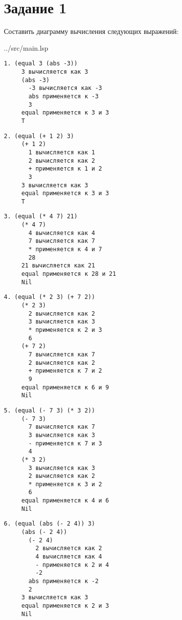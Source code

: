 \section*{Задание 1}

Составить диаграмму вычисления следующих выражений:

\begin{lstinputlisting}[
	caption={Задание 1},
	label={lst:t1},
	style={lsp},
	linerange={3-8},
	]{../src/main.lsp}
\end{lstinputlisting}

\begin{lstlisting}[style={scheme}]
1. (equal 3 (abs -3))
     3 вычисляется как 3
     (abs -3)
       -3 вычисляется как -3
       abs применяется к -3
       3
     equal применяется к 3 и 3
     T
\end{lstlisting}

\begin{lstlisting}[style={scheme}]
2. (equal (+ 1 2) 3)
     (+ 1 2)
       1 вычисляется как 1
       2 вычисляется как 2
       + применяется к 1 и 2
       3
     3 вычисляется как 3
     equal применяется к 3 и 3
     T
\end{lstlisting}

\clearpage
\begin{lstlisting}[style={scheme}]
3. (equal (* 4 7) 21)
     (* 4 7)
       4 вычисляется как 4
       7 вычисляется как 7
       * применяется к 4 и 7
       28
     21 вычисляется как 21
     equal применяется к 28 и 21
     Nil
\end{lstlisting}

\begin{lstlisting}[style={scheme}]
4. (equal (* 2 3) (+ 7 2))
     (* 2 3)
       2 вычисляется как 2
       3 вычисляется как 3
       * применяется к 2 и 3
       6
     (+ 7 2)
       7 вычисляется как 7
       2 вычисляется как 2
       + применяется к 7 и 2
       9
     equal применяется к 6 и 9
     Nil
\end{lstlisting}

\clearpage
\begin{lstlisting}[style={scheme}]
5. (equal (- 7 3) (* 3 2))
     (- 7 3)
       7 вычисляется как 7
       3 вычисляется как 3
       - применяется к 7 и 3
       4
     (* 3 2)
       3 вычисляется как 3
       2 вычисляется как 2
       * применяется к 3 и 2
       6
     equal применяется к 4 и 6
     Nil
\end{lstlisting}

\begin{lstlisting}[style={scheme}]
6. (equal (abs (- 2 4)) 3)
     (abs (- 2 4))
       (- 2 4)
         2 вычисляется как 2
         4 вычисляется как 4
         - применяется к 2 и 4
         -2
       abs применяется к -2
       2
     3 вычисляется как 3
     equal применяется к 2 и 3
     Nil
\end{lstlisting}

